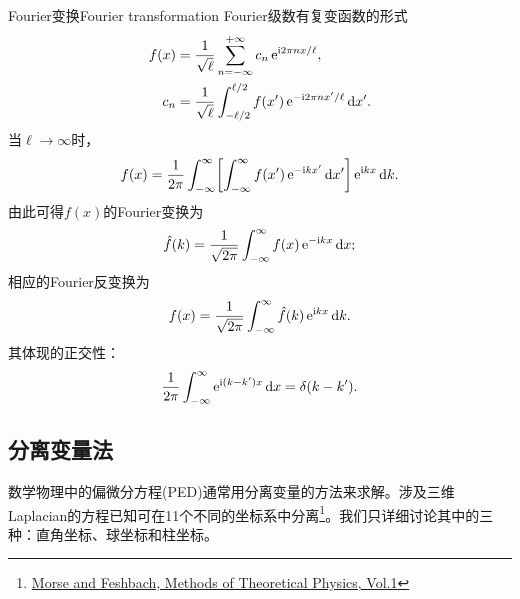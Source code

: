 \begin{example}{Fourier变换}{Fourier transformation}
    Fourier级数有复变函数的形式
    \begin{subequations}
        \label{eq:ed-complex-fourier-series}
        \begin{align}
            f(x) &= \frac1{\sqrt\ell}\sum_{n=-\infty}^{+\infty}c_n\mathop{}\!\mathrm{e}^{\mathrm{i}2\pi nx/\ell},\\
            c_n &= \frac1{\sqrt\ell}\int_{-\ell/2}^{\ell/2}f(x')\mathop{}\!\mathrm{e}^{-\mathrm{i}2\pi nx'/\ell}\mathop{}\!\mathrm{d} x'.
        \end{align}
    \end{subequations}
    当$\ell \to \infty$时，
    \[
        f(x) = \frac1{2\pi}\int_{-\infty}^\infty\biggl[\int_{-\infty}^\infty f(x')\mathop{}\!\mathrm{e}^{-\mathrm{i} kx'}\mathop{}\!\mathrm{d} x'\biggr]\mathop{}\!\mathrm{e}^{\mathrm{i} kx}\mathop{}\!\mathrm{d} k.
    \]
    由此可得$f(x)$的Fourier变换为
    \begin{equation}
        \hat f(k) = \frac1{\sqrt{2\pi}}\int_{-\infty}^\infty f(x)\mathop{}\!\mathrm{e}^{-\mathrm{i} kx}\mathop{}\!\mathrm{d} x;
    \end{equation}
    相应的Fourier反变换为
    \begin{equation}
        f(x) = \frac1{\sqrt{2\pi}}\int_{-\infty}^\infty\hat f(k)\mathop{}\!\mathrm{e}^{\mathrm{i} kx}\mathop{}\!\mathrm{d} k.
    \end{equation}
    其体现的正交性：
    \begin{equation}
        \label{eq:ed-plane-wave-orthogonality}
        \frac1{2\pi}\int_{-\infty}^\infty\mathop{}\!\mathrm{e}^{\mathrm{i}(k-k')x}\mathop{}\!\mathrm{d} x = \delta(k - k').
    \end{equation}
\end{example}

\subsection{分离变量法}
\label{ssec:separation of variables}

数学物理中的偏微分方程(PED)通常用分离变量的方法来求解。涉及三维Laplacian的方程已知可在11个不同的坐标系中分离\footnote{\href{https://www.researchgate.net/publication/316991519_Morse_and_Feshbach's_Methods_of_Theoretical_Physics_Vol1_Morse_and_Feshbach_1953}{Morse and Feshbach, Methods of Theoretical Physics, Vol.1}}。我们只详细讨论其中的三种：直角坐标、球坐标和柱坐标。

